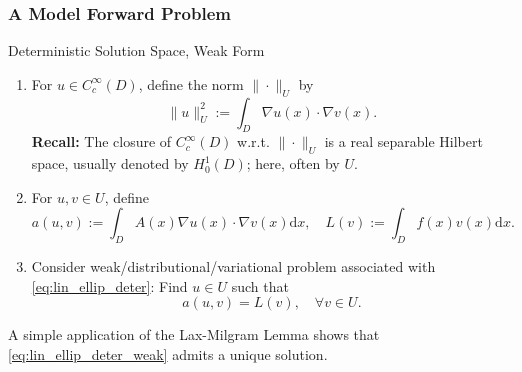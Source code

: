\documentclass[aspectratio=169,xcolor=dvipsnames,10pt]{beamer}
\begin{document}
\begin{frame}\frametitle{A Model Forward Problem}
\begin{block}{Deterministic Solution Space, Weak Form}
\begin{enumerate}
\item For $u \in C^{\infty}_{c}(D)$, define the norm $\| \cdot \|_{U}$ by
\[
\| u \|^2_{U} := \int_{D} \nabla u(x) \cdot \nabla v(x).
\]
\textbf{Recall:} The closure of $C^{\infty}_{c}(D)$ w.r.t. $\| \cdot \|_{U}$ is a real separable Hilbert space, usually denoted by $H^1_0(D)$; here, often by $U$.
\item For $u, v \in U$, define
\[
a(u,v) := \int_{D} A(x) \nabla u(x) \cdot \nabla v(x) \mathrm{d}x,\quad 
L(v) := \int_{D} f(x) v(x) \mathrm{d}x.
\]
\item Consider weak/distributional/variational problem associated with \eqref{eq:lin_ellip_deter}:
Find $u \in U$ such that
\begin{equation}\label{eq:lin_ellip_deter_weak}
a(u,v) = L(v),\quad \forall v \in U.
\end{equation}
\end{enumerate}
\end{block}
\begin{block}{}
\centering
A simple application of the Lax-Milgram Lemma shows that \eqref{eq:lin_ellip_deter_weak} admits a unique solution.
\end{block}
\end{frame}

\end{document}
